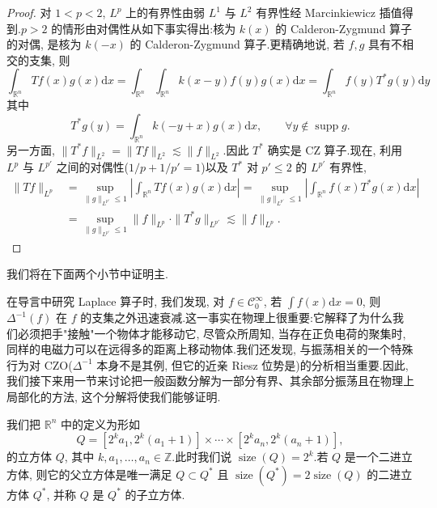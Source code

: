 \begin{proof}
对 $1 < p < 2$, $L^p$ 上的有界性由弱 $L^1$ 与 $L^2$ 有界性经 Marcinkiewicz 插值得到.$p > 2$ 的情形由对偶性从如下事实得出:核为 $k(x)$ 的 Calderon-Zygmund 算子的对偶, 是核为 $k(-x)$ 的 Calderon-Zygmund 算子.更精确地说, 若 $f, g$ 具有不相交的支集, 则
\[
\int_{\mathbb{R}^n} Tf(x) g(x) \mathrm{d}x = \int_{\mathbb{R}^n} \int_{\mathbb{R}^n} k(x-y) f(y) g(x) \mathrm{d}x = \int_{\mathbb{R}^n} f(y) T^* g(y) \mathrm{d}y
\]
其中
\[
T^* g(y) = \int_{\mathbb{R}^n} k(-y+x) g(x) \mathrm{d}x, \qquad \forall y \notin \operatorname{supp} g.
\]
另一方面, $\|T^* f\|_{L^2} = \|Tf\|_{L^2} \lesssim \|f\|_{L^2}$.因此 $T^*$ 确实是 CZ 算子.现在, 利用 $L^p$ 与 $L^{p'}$ 之间的对偶性($1/p + 1/p' = 1$)以及 $T^*$ 对 $p' \leq 2$ 的 $L^{p'}$ 有界性,
\[
\begin{array}{ll}
\|Tf\|_{L^p} &= \sup_{\|g\|_{L^{p'}} \leq 1} \left|\int_{\mathbb{R}^n} Tf(x) g(x) \mathrm{d}x\right| = \sup_{\|g\|_{L^{p'}} \leq 1} \left|\int_{\mathbb{R}^n} f(x) T^* g(x) \mathrm{d}x\right| \\
&= \sup_{\|g\|_{L^{p'}} \leq 1} \|f\|_{L^p} \cdot \|T^* g\|_{L^{p'}} \lesssim \|f\|_{L^p}.
\end{array}
\]
\end{proof}

我们将在下面两个小节中证明主.


在导言中研究 Laplace 算子时, 我们发现, 对 $f \in \mathcal{C}_0^\infty$, 若 $\int f(x) \mathrm{d}x = 0$, 则 $\Delta^{-1}(f)$ 在 $f$ 的支集之外迅速衰减.这一事实在物理上很重要:它解释了为什么我们必须把手"接触"一个物体才能移动它, 尽管众所周知, 当存在正负电荷的聚集时, 同样的电磁力可以在远得多的距离上移动物体.我们还发现, 与振荡相关的一个特殊行为对 CZO($\Delta^{-1}$ 本身不是其例, 但它的近亲 Riesz 位势是)的分析相当重要.因此, 我们接下来用一节来讨论把一般函数分解为一部分有界、其余部分振荡且在物理上局部化的方法, 这个分解将使我们能够证明.

\begin{definition}[二进立方体]\label{def:c6-6.6}
我们把 $\mathbb{R}^n$ 中的定义为形如
\[
Q = [2^k a_1, 2^k(a_1+1)] \times \cdots \times [2^k a_n, 2^k(a_n+1)],
\]
的立方体 $Q$, 其中 $k, a_1, \ldots, a_n \in \mathbb{Z}$.此时我们说 $\operatorname{size}(Q) = 2^k$.若 $Q$ 是一个二进立方体, 则它的父立方体是唯一满足 $Q \subset Q^*$ 且 $\operatorname{size}(Q^*) = 2 \operatorname{size}(Q)$ 的二进立方体 $Q^*$, 并称 $Q$ 是 $Q^*$ 的子立方体.
\end{definition}

